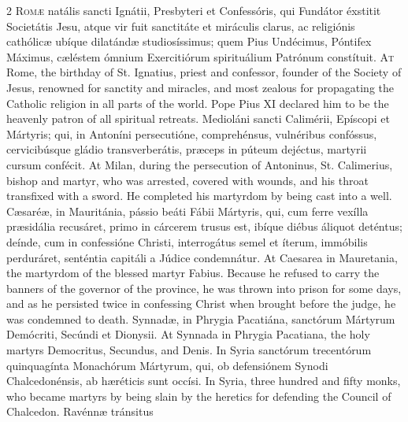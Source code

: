 \begin{paracol}{2}
\lettrine[lines=2]{R}{omæ} natális sancti 
 Ignátii, Presbyteri et Confessóris, qui Fundátor éxstitit Societátis Jesu, 
 atque vir fuit sanctitáte et miráculis clarus, ac religiónis cathólicæ 
 ubíque dilatándæ studiosíssimus; quem Pius Undécimus, Póntifex Máximus, 
 cæléstem ómnium Exercitiórum spirituálium Patrónum constítuit.
\switchcolumn
{}
\lettrine[lines=2]{A}{t} Rome, the birthday of St. 
 Ignatius, priest and confessor, founder of the Society of Jesus, renowned 
 for sanctity and miracles, and most zealous for propagating the Catholic 
 religion in all parts of the world. Pope Pius XI declared him to be 
 the heavenly patron of all spiritual retreats.
\switchcolumn*
{}
Medioláni sancti 
 Calimérii, Epíscopi et Mártyris; qui, in Antoníni persecutióne, comprehénsus, 
 vulnéribus confóssus, cervicibúsque gládio transverberátis, præceps in 
 púteum dejéctus, martyrii cursum confécit.
\switchcolumn
{}
At Milan, during the persecution of 
 Antoninus, St. Calimerius, bishop and martyr, who was arrested, covered with 
 wounds, and his throat transfixed with a sword. He completed his 
 martyrdom by being cast into a well.
\switchcolumn*
{}
Cæsaréæ, in Mauritánia, pássio beáti Fábii Mártyris, qui, cum ferre vexílla præsidália recusáret, 
 primo in cárcerem trusus est, ibíque diébus áliquot deténtus; deínde, cum in 
 confessióne Christi, interrogátus semel et íterum, immóbilis perduráret, 
 senténtia capitáli a Júdice condemnátur.
\switchcolumn
{}
At Caesarea in Mauretania, the 
 martyrdom of the blessed martyr Fabius. Because he refused to carry 
 the banners of the governor of the province, he was thrown into prison for 
 some days, and as he persisted twice in confessing Christ when brought 
 before the judge, he was condemned to death.
\switchcolumn*
{}
Synnadæ, in Phrygia 
 Pacatiána, sanctórum Mártyrum Demócriti, Secúndi et Dionysii.
\switchcolumn
{}
At Synnada in Phrygia Pacatiana, the 
 holy martyrs Democritus, Secundus, and Denis.
\switchcolumn*
{}
In Syria sanctórum 
 trecentórum quinquagínta Monachórum Mártyrum, qui, ob defensiónem Synodi 
 Chalcedonénsis, ab hæréticis sunt occísi.
\switchcolumn
{}
In Syria, three hundred and fifty 
 monks, who became martyrs by being slain by the heretics for defending the 
 Council of Chalcedon.
\switchcolumn*
{}
Ravénnæ tránsitus 

\end{paracol}

